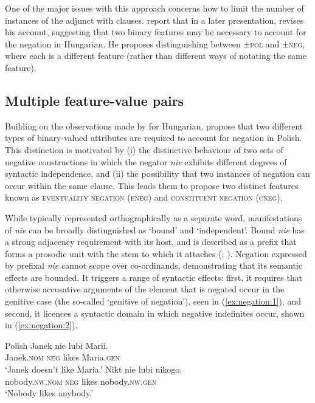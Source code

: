 \documentclass[output=paper,hidelinks]{langscibook}
\begin{document}
One of the major issues with this approach concerns how to limit the number of instances of the adjunct with clauses.  \citet{przepiorkowski2015two} report that in a later presentation, \citet{Laczko2015} revises his account, suggesting that two binary features may be necessary to account for the negation in Hungarian. He proposes distinguishing between ±\textsc{pol} and ±\textsc{neg}, where each is a different feature (rather than different ways of notating the same feature).

\subsection{Multiple feature-value pairs}
\label{sec:negation:multiple-features}

Building on the observations made by \citet{Laczko2015} for Hungarian, \citet{przepiorkowski2015two} propose that two different types of binary-valued attributes are required to account for negation in Polish. This distinction is motivated by (i) the distinctive behaviour of two sets of negative constructions in which the negator \emph{nie} exhibits different degrees of syntactic independence, and (ii) the possibility that two instances of negation can occur within the same clause. This leads them to propose two distinct features known as \textsc{eventuality negation} (\textsc{eneg}) and \textsc{constituent negation} (\textsc{cneg}). 

While typically represented orthographically as a separate word, manifestations of \emph{nie} can be broadly distinguished as `bound' and `independent'. Bound \emph{nie} has a strong adjacency requirement with its host, and is described as a prefix that forms a prosodic unit with the stem to which it attaches (\citealt {Kupsc:Przepiorkowski:02}; \citealt [324]{przepiorkowski2015two}). Negation expressed by prefixal \emph{nie} cannot scope over co-ordinands, demonstrating that its semantic effects are bounded. It triggers a range of syntactic effects: first, it requires that otherwise accusative arguments of the element that is negated occur in the genitive case (the so-called `genitive of negation'), seen in (\ref{ex:negation:1}), and second, it licences a syntactic domain in which negative indefinites occur, shown in (\ref{ex:negation:2}). 

\ea Polish \citep [324]{przepiorkowski2015two}
\ea\label{ex:negation:1}
\gll Janek nie lubi Marii.\\  
     Janek.\textsc{nom} \textsc{neg} likes Maria.\textsc{gen}\\ 
\glt `Janek doesn't like Maria.'
\ex\label{ex:negation:2}
\gll Nikt nie lubi nikogo.\\  
     nobody.\textsc{nw.nom} \textsc{neg} likes nobody.\textsc{nw.gen}\\ 
\glt `Nobody likes anybody.'
\z\z
\end{document}
